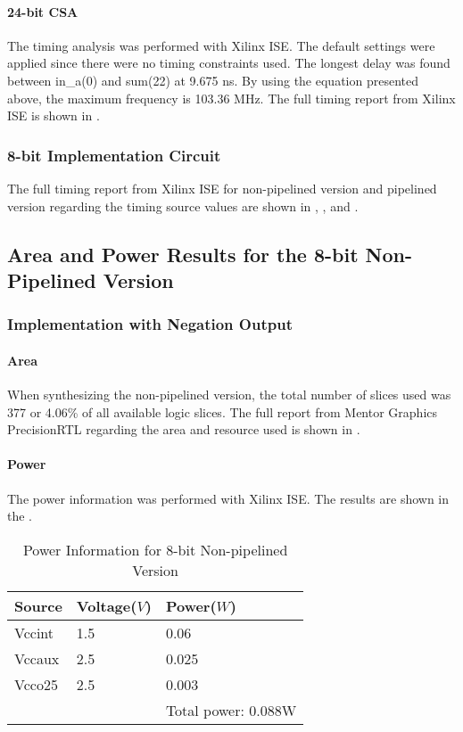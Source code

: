 \paragraph{24-bit CSA}
The timing analysis was performed with Xilinx ISE.
The default settings were applied since there were no timing constraints used.
The longest delay was found between in\_a(0) and sum(22) at 9.675 ns.
By using the equation presented above, the maximum frequency is 103.36 MHz.
The full timing report from Xilinx ISE is shown in .

\subsubsection{8-bit Implementation Circuit}
The full timing report from Xilinx ISE for non-pipelined version and pipelined version regarding
the timing source values are shown in , , and .

\subsection{Area and Power Results for the 8-bit Non-Pipelined Version}
\subsubsection{Implementation with Negation Output}
\paragraph{Area}

When synthesizing the non-pipelined version, the total number of slices used was 377 or 4.06\% 
of all available logic slices. The full report from Mentor Graphics PrecisionRTL regarding the area
and resource used is shown in .

\paragraph{Power}

\noindent The power information was performed with Xilinx ISE. The results are shown in the .

\begin{table}[!ht]
	\renewcommand{\arraystretch}{1.3}
	\caption{Power Information for 8-bit Non-pipelined Version}
	\centering
	\begin{tabular}{ p{4cm} p{4cm} p{4cm} }
		\hline
		\bfseries Source & \bfseries Voltage(\(V\)) & \bfseries Power(\(W\)) \\
		\hline
		Vccint           & 1.5                      & 0.06                   \\
		Vccaux           & 2.5                      & 0.025                  \\
		Vcco25           & 2.5                      & 0.003                  \\
		\hline
		                 &                          & Total power: 0.088W    \\
	\end{tabular}
	\label{tb:non_p_power}
\end{table}

